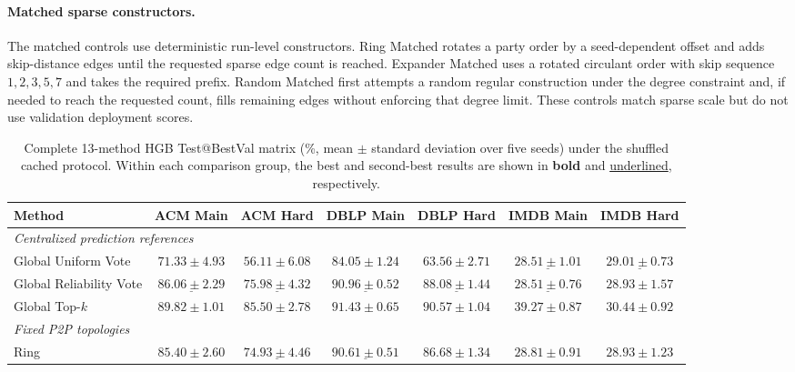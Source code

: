 \documentclass[letterpaper]{article}
\begin{document}
\paragraph{Matched sparse constructors.}
The matched controls use deterministic run-level constructors. Ring Matched
rotates a party order by a seed-dependent offset and adds skip-distance edges
until the requested sparse edge count is reached. Expander Matched uses a
rotated circulant order with skip sequence $1,2,3,5,7$ and takes the required
prefix. Random Matched first attempts a random regular construction under the
degree constraint and, if needed to reach the requested count, fills remaining
edges without enforcing that degree limit. These controls match sparse scale
but do not use validation deployment scores.

\begin{table}[!t]
\centering
\scriptsize
\setlength{\tabcolsep}{2.6pt}
\caption{Complete 13-method HGB Test@BestVal matrix (\%, mean $\pm$ standard
deviation over five seeds) under the shuffled cached protocol.
Within each comparison group, the best and second-best results are shown in
\textbf{bold} and \underline{underlined}, respectively.}
\label{tab:supp-complete}
\begin{tabular}{lcccccc}
\toprule
Method & ACM Main & ACM Hard & DBLP Main & DBLP Hard & IMDB Main & IMDB Hard \\
\midrule

\multicolumn{7}{l}{\textit{Centralized prediction references}} \\
Global Uniform Vote
& $71.33\pm4.93$
& $56.11\pm6.08$
& $84.05\pm1.24$
& $63.56\pm2.71$
& $\underline{28.51\pm1.01}$
& $\underline{29.01\pm0.73}$ \\

Global Reliability Vote
& $\underline{86.06\pm2.29}$
& $\underline{75.98\pm4.32}$
& $\underline{90.96\pm0.52}$
& $\underline{88.08\pm1.44}$
& $\underline{28.51\pm0.76}$
& $28.93\pm1.57$ \\

Global Top-$k$
& $\mathbf{89.82\pm1.01}$
& $\mathbf{85.50\pm2.78}$
& $\mathbf{91.43\pm0.65}$
& $\mathbf{90.57\pm1.04}$
& $\mathbf{39.27\pm0.87}$
& $\mathbf{30.44\pm0.92}$ \\

\midrule
\multicolumn{7}{l}{\textit{Fixed P2P topologies}} \\
Ring
& $85.40\pm2.60$
& $\underline{74.93\pm4.46}$
& $\underline{90.61\pm0.51}$
& $86.68\pm1.34$
& $\mathbf{28.81\pm0.91}$
& $28.93\pm1.23$ \\


\end{tabular}
\end{table}
\end{document}
